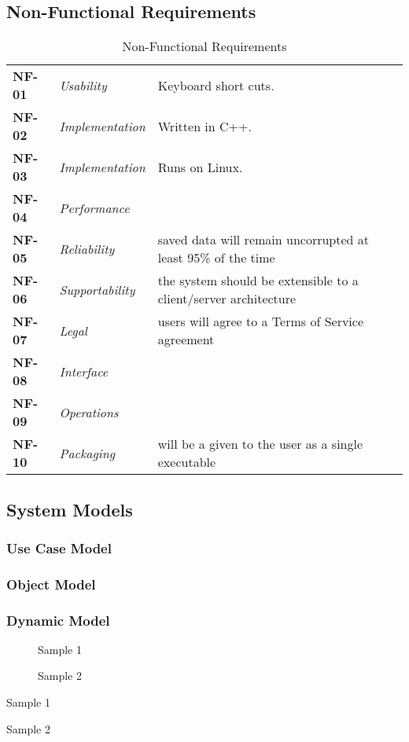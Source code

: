 \documentclass[12pt,letterpaper]{article}
\begin{document}
\subsection{Non-Functional Requirements}

\begin{table}[H]
\caption{Non-Functional Requirements}
\renewcommand{\arraystretch}{1.5}
\everyrow{\hline}
\begin{tabu} to 
NF-01 & Usability & Keyboard short cuts. \\
NF-02 & Implementation & Written in C++. \\
NF-03 & Implementation & Runs on Linux. \\
NF-04 & Performance & \\
NF-05 & Reliability & saved data will remain uncorrupted at least 95\% of the time \\
NF-06 & Supportability & the system should be extensible to a client/server architecture \\
NF-07 & Legal & users will agree to a Terms of Service agreement \\
NF-08 & Interface & \\
NF-09 & Operations & \\
NF-10 & Packaging & will be a given to the user as a single executable \\
\end{tabu}
\end{table}

\subsection{System Models}


\subsubsection{Use Case Model}


\subsubsection{Object Model}


\subsubsection{Dynamic Model}

\begin{figure}[H]
\protect\caption{Sample 1}


\end{figure}


\begin{figure}[H]
\protect\caption{Sample 2}


\end{figure}


\begin{table}[H]
\protect\caption{Sample 1}


\end{table}


\begin{table}[H]
\protect\caption{Sample 2}


\end{table}
\end{document}
